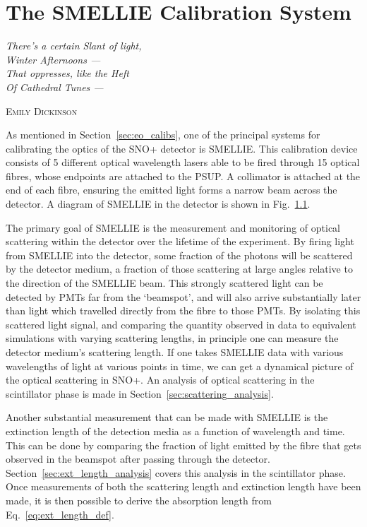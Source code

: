 \chapter{The SMELLIE Calibration System}\label{chap:smellie_hardware}
\epigraph{\textit{There's a certain Slant of light,\\
Winter Afternoons ---\\
That oppresses, like the Heft\\
Of Cathedral Tunes ---}}{\textsc{Emily Dickinson}}

As mentioned in Section~\ref{sec:eo_calibs}, one of the principal systems for calibrating the optics of the SNO+ detector is SMELLIE. This calibration device consists of 5 different optical wavelength lasers able to be fired through 15 optical fibres, whose endpoints are attached to the PSUP. A collimator is attached at the end of each fibre, ensuring the emitted light forms a narrow beam across the detector. A diagram of SMELLIE in the detector is shown in Fig.~\ref{fig:smellie_diagram}.

\begin{figure}
    \centering
    \caption[]{}
    \label{fig:smellie_diagram}
\end{figure}

The primary goal of SMELLIE is the measurement and monitoring of optical scattering within the detector over the lifetime of the experiment. By firing light from SMELLIE into the detector, some fraction of the photons will be scattered by the detector medium, a fraction of those scattering at large angles relative to the direction of the SMELLIE beam. This strongly scattered light can be detected by PMTs far from the `beamspot', and will also arrive substantially later than light which travelled directly from the fibre to those PMTs. By isolating this scattered light signal, and comparing the quantity observed in data to equivalent simulations with varying scattering lengths, in principle one can measure the detector medium's scattering length. If one takes SMELLIE data with various wavelengths of light at various points in time, we can get a dynamical picture of the optical scattering in SNO+. An analysis of optical scattering in the scintillator phase is made in Section~\ref{sec:scattering_analysis}.

Another substantial measurement that can be made with SMELLIE is the extinction length of the detection media as a function of wavelength and time. This can be done by comparing the fraction of light emitted by the fibre that gets observed in the beamspot after passing through the detector. Section~\ref{sec:ext_length_analysis} covers this analysis in the scintillator phase. Once measurements of both the scattering length and extinction length have been made, it is then possible to derive the absorption length from Eq.~\ref{eq:ext_length_def}.

